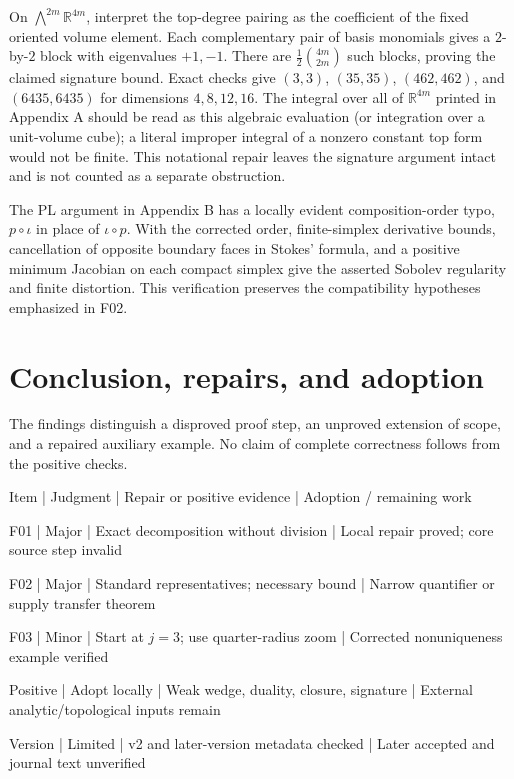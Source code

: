 \documentclass[10pt]{article}
\begin{document}
On \(\bigwedge^{2m}\mathbb R^{4m}\), interpret the top-degree pairing as the coefficient of the fixed oriented volume element. Each complementary pair of basis monomials gives a \(2\)-by-\(2\) block with eigenvalues \(+1,-1\). There are \(\frac12\binom{4m}{2m}\) such blocks, proving the claimed signature bound. Exact checks give \((3,3)\), \((35,35)\), \((462,462)\), and \((6435,6435)\) for dimensions \(4,8,12,16\). The integral over all of \(\mathbb R^{4m}\) printed in Appendix A should be read as this algebraic evaluation (or integration over a unit-volume cube); a literal improper integral of a nonzero constant top form would not be finite. This notational repair leaves the signature argument intact and is not counted as a separate obstruction.\par
The PL argument in Appendix B has a locally evident composition-order typo, \(p\circ\iota\) in place of \(\iota\circ p\). With the corrected order, finite-simplex derivative bounds, cancellation of opposite boundary faces in Stokes’ formula, and a positive minimum Jacobian on each compact simplex give the asserted Sobolev regularity and finite distortion. This verification preserves the compatibility hypotheses emphasized in F02.\par
\section*{Conclusion, repairs, and adoption}
The findings distinguish a disproved proof step, an unproved extension of scope, and a repaired auxiliary example. No claim of complete correctness follows from the positive checks.\par
Item | Judgment | Repair or positive evidence | Adoption / remaining work\par
F01 | Major | Exact decomposition without division | Local repair proved; core source step invalid\par
F02 | Major | Standard representatives; necessary bound | Narrow quantifier or supply transfer theorem\par
F03 | Minor | Start at \(j=3\); use quarter-radius zoom | Corrected nonuniqueness example verified\par
Positive | Adopt locally | Weak wedge, duality, closure, signature | External analytic/topological inputs remain\par
Version | Limited | v2 and later-version metadata checked | Later accepted and journal text unverified\par
\end{document}
